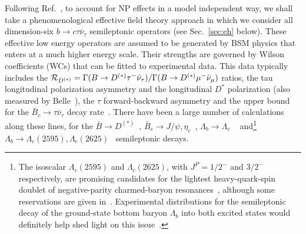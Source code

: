 \documentclass[aps,superscriptaddress,showpacs,nofootinbib,11pt]{revtex4-1}
\begin{document}
Following Ref.~\cite{Fajfer:2012vx}, to account for NP effects in a model independent way, we shall take a phenomenological effective field theory approach in which we consider all dimension-six $b\to c\tau\bar\nu_\tau$ semileptonic operators (see Sec.~\ref{sec:eh} below). These effective low energy operators are assumed to be generated by BSM physics that enters at a much higher energy scale. Their strengths  are governed by Wilson coefficients (WCs)
 that can be fitted to experimental data.  This data typically includes the 
 ${\cal R}_{D^{(*)}}=\Gamma(B\to D^{(*)}\tau^-\bar\nu_\tau)/
 \Gamma(B\to D^{(*)}\mu^-\bar\nu_\mu)$ ratios, the tau longitudinal polarization  
asymmetry  and the  longitudinal  $D^*$ polarization (also  measured
by Belle~\cite{Belle:2016dyj, Belle:2019ewo}), the $\tau$ forward-backward
asymmetry and the upper bound for the $\bar B_c\to \tau\bar\nu_\tau$  decay rate~\cite{Alonso:2016oyd}. There have been a large number of calculations along these lines, for the  
 $\bar B \to D^{(*)}$~\cite{Nierste:2008qe, Tanaka:2012nw, Fajfer:2012vx, 
Duraisamy:2013pia,Duraisamy:2014sna,Becirevic:2016hea, Ligeti:2016npd, Ivanov:2017mrj,
Bernlochner:2017jka, Blanke:2018yud, Bhattacharya:2018kig, Colangelo:2018cnj,Murgui:2019czp, 
Shi:2019gxi, Alok:2019uqc, Mandal:2020htr, Kumbhakar:2020jdz,Iguro:2020cpg, 
Bhattacharya:2020lfm,  Penalva:2021gef,Penalva:2020ftd},   
$\bar B_c\to J/\psi,\eta_c$~\cite{Dutta:2017xmj,Tran:2018kuv,Leljak:2019eyw,Harrison:2020nrv, Penalva:2020ftd}, $\Lambda_b \to \Lambda_c$ ~\cite{Dutta:2015ueb,Shivashankara:2015cta, Li:2016pdv,Datta:2017aue,Ray:2018hrx,
Blanke:2018yud,Gutsche:2018nks,Bernlochner:2018bfn,DiSalvo:2018ngq,Blanke:2019qrx,
Boer:2019zmp,Murgui:2019czp,Mu:2019bin,Hu:2020axt, Penalva:2019rgt, 
Penalva:2020xup, Penalva:2021gef,Bernlochner:2022hyz} and\footnote{The
 isoscalar $\Lambda_c(2595)$ and $\Lambda_c(2625)$, with $J^P=1/2^-$ and $3/2^-$ respectively, are promising candidates for the lightest heavy-quark-spin doublet
 of negative-parity charmed-baryon  resonances~\cite{Leibovich:1997az,Papucci:2021pmj,Du:2022rbf}, although some reservations are given in~\cite{Nieves:2019nol}.  Experimental distributions for the semileptonic decay of the ground-state bottom baryon $\Lambda_b$ into both excited states would definitely help shed light on this issue~\cite{Du:2022rbf}.} $\Lambda_b \to \Lambda_c(2595), \Lambda_c(2625)$~\cite{Leibovich:1997az,Boer:2018vpx,Gutsche:2018nks,Nieves:2019kdh,Meinel:2021rbm,Papucci:2021pmj,Du:2022ipt}  semileptonic decays.
\end{document}
